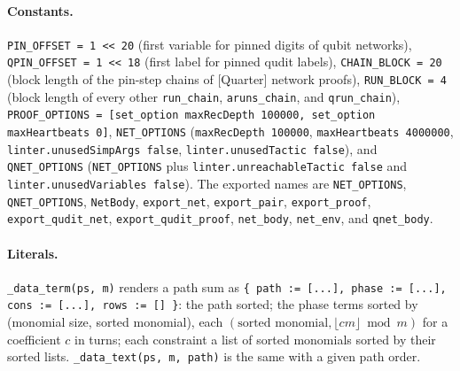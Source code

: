 \paragraph{Constants.} \textnormal{\texttt{PIN\_\allowbreak{}OFFSET = 1 << 20}} (first variable for pinned digits of qubit
networks), \textnormal{\texttt{QPIN\_\allowbreak{}OFFSET = 1 << 18}} (first label for pinned qudit labels), \textnormal{\texttt{CHAIN\_\allowbreak{}BLOCK = 20}}
(block length of the pin-step chains of [Quarter] network proofs), \textnormal{\texttt{RUN\_\allowbreak{}BLOCK = 4}} (block length of
every other \textnormal{\texttt{run\_\allowbreak{}chain}}, \textnormal{\texttt{aruns\_\allowbreak{}chain}}, and \textnormal{\texttt{qrun\_\allowbreak{}chain}}), \textnormal{\texttt{PROOF\_\allowbreak{}OPTIONS = [set\_\allowbreak{}option maxRecDepth 100000,\allowbreak{} set\_\allowbreak{}option maxHeartbeats 0]}},
\textnormal{\texttt{NET\_\allowbreak{}OPTIONS}} (\textnormal{\texttt{maxRecDepth 100000}}, \textnormal{\texttt{maxHeartbeats 4000000}},
\textnormal{\texttt{linter.\allowbreak{}unusedSimpArgs false}}, \textnormal{\texttt{linter.\allowbreak{}unusedTactic false}}), and \textnormal{\texttt{QNET\_\allowbreak{}OPTIONS}}
(\textnormal{\texttt{NET\_\allowbreak{}OPTIONS}} plus \textnormal{\texttt{linter.\allowbreak{}unreachableTactic false}} and \textnormal{\texttt{linter.\allowbreak{}unusedVariables false}}).
The exported names are \textnormal{\texttt{NET\_\allowbreak{}OPTIONS}}, \textnormal{\texttt{QNET\_\allowbreak{}OPTIONS}}, \textnormal{\texttt{NetBody}}, \textnormal{\texttt{export\_\allowbreak{}net}},
\textnormal{\texttt{export\_\allowbreak{}pair}}, \textnormal{\texttt{export\_\allowbreak{}proof}}, \textnormal{\texttt{export\_\allowbreak{}qudit\_\allowbreak{}net}}, \textnormal{\texttt{export\_\allowbreak{}qudit\_\allowbreak{}proof}},
\textnormal{\texttt{net\_\allowbreak{}body}}, \textnormal{\texttt{net\_\allowbreak{}env}}, and \textnormal{\texttt{qnet\_\allowbreak{}body}}.

\paragraph{Literals.} \textnormal{\texttt{\_\allowbreak{}data\_\allowbreak{}term(\allowbreak{}ps,\allowbreak{} m)}} renders a path sum as
\textnormal{\texttt{\{ path := [.\allowbreak{}.\allowbreak{}.\allowbreak{}],\allowbreak{} phase := [.\allowbreak{}.\allowbreak{}.\allowbreak{}],\allowbreak{} cons := [.\allowbreak{}.\allowbreak{}.\allowbreak{}],\allowbreak{} rows := [] \}}}: the path sorted; the phase terms
sorted by (monomial size, sorted monomial), each $(\text{sorted monomial}, \lfloor cm\rfloor\bmod m)$
for a coefficient $c$ in turns; each constraint a list of sorted monomials sorted by their sorted
lists. \textnormal{\texttt{\_\allowbreak{}data\_\allowbreak{}text(\allowbreak{}ps,\allowbreak{} m,\allowbreak{} path)}} is the same with a given path order.

